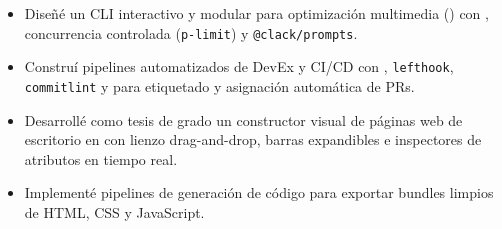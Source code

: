 

\begin{itemize}
    \item Diseñé un CLI interactivo y modular para optimización multimedia (\texttt{}) con , concurrencia controlada (\texttt{p-limit}) y \texttt{@clack/prompts}.
    \item Construí pipelines automatizados de DevEx y CI/CD con , \texttt{lefthook}, \texttt{commitlint} y  para etiquetado y asignación automática de PRs.
\end{itemize}
\vspace{8.5pt}

\begin{itemize}
    \item Desarrollé como tesis de grado un constructor visual de páginas web de escritorio en  con lienzo drag-and-drop, barras expandibles e inspectores de atributos en tiempo real.
    \item Implementé pipelines de generación de código para exportar bundles limpios de HTML, CSS y JavaScript.
\end{itemize}
